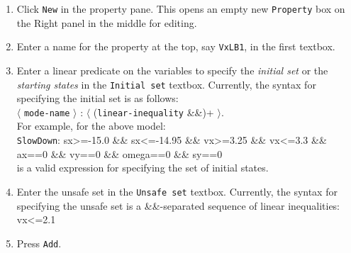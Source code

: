 \documentclass{tufte-book} %
\begin{document}
\begin{enumerate}
\item Click \texttt{New} in the property pane. This opens an empty new \texttt{Property} box on the Right panel in the middle for editing.
\item Enter a name for the property at the top, say \texttt{VxLB1}, in the first textbox.
\item Enter a linear predicate on the variables to specify the {\em initial set\/} or the {\em starting states\/} in the \texttt{Initial set} textbox. 
Currently, the syntax for specifying the initial set is as follows:\\
$\langle$ \texttt{mode-name} $\rangle$ : $\langle$ (\texttt{linear-inequality} \&\&)+ $\rangle$. \\
For example, for the above model: \\
\texttt{SlowDown}: sx>=-15.0 \&\& sx<=-14.95 
\&\& vx>=3.25 \&\& vx<=3.3 \&\& ax==0 \&\& vy==0
\&\& omega==0 \&\& sy==0  \\
is a valid expression for specifying the set of initial states. 
\item Enter the unsafe set in the \texttt{Unsafe set} textbox.
Currently, the syntax for specifying the unsafe set is a \&\&-separated sequence of linear inequalities:\\
vx<=2.1 
\item Press \texttt{Add}.
\end{enumerate}
%
\end{document}
